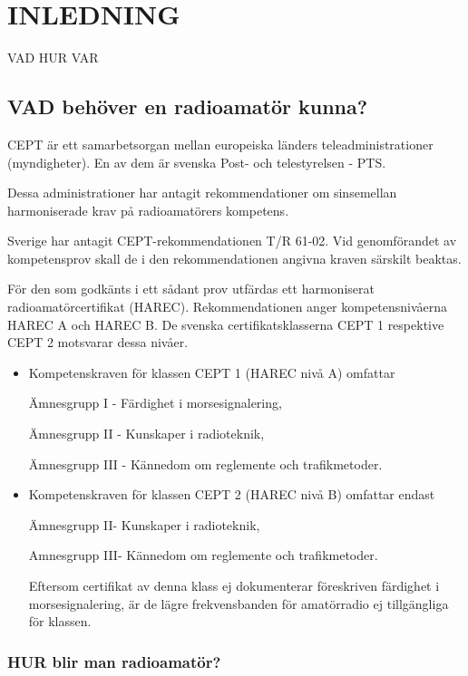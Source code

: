 \documentclass[a4paper,twoside,twocolumn,openright]{book}
\begin{document}
\pagebreak

\chapter*{INLEDNING}

VAD HUR VAR

\section*{VAD behöver en radioamatör kunna?}

CEPT är ett samarbetsorgan mellan europeiska länders teleadministrationer (myndigheter). En av dem är svenska Post- och telestyrelsen - PTS.

Dessa administrationer har antagit rekommendationer om sinsemellan harmoniserade krav på radioamatörers kompetens.


Sverige har antagit CEPT-rekommendationen T/R 61-02. Vid genomförandet av
kompetensprov skall de i den rekommendationen angivna kraven särskilt beaktas.


För den som godkänts i ett sådant prov utfärdas ett harmoniserat radioamatörcertifikat
(HAREC). Rekommendationen anger kompetensnivåerna HAREC A och HAREC B. De svenska
certifikatsklasserna CEPT 1 respektive CEPT 2 motsvarar dessa nivåer.

\begin{itemize}
\item Kompetenskraven för klassen CEPT 1
(HAREC nivå A) omfattar

Ämnesgrupp I - Färdighet i morsesignalering,

Ämnesgrupp II - Kunskaper i radioteknik,

Ämnesgrupp III - Kännedom om reglemente och trafikmetoder.

\item Kompetenskraven för klassen CEPT 2
(HAREC nivå B) omfattar endast

Ämnesgrupp II- Kunskaper i radioteknik,

Amnesgrupp III- Kännedom om reglemente och trafikmetoder.

Eftersom certifikat av denna klass ej dokumenterar föreskriven färdighet i
morsesignalering, är de lägre frekvensbanden för amatörradio ej tillgängliga för klassen.
\end{itemize}

\subsection*{HUR blir man radioamatör?}
\end{document}
